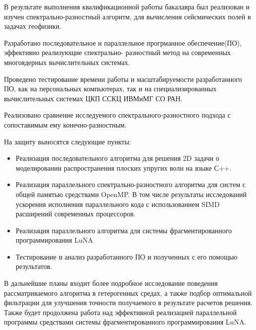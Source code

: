 
В результате выполнения квалификационной работы бакалавра был реализован и изучен спектрально-разностный алгоритм,
для вычисления сейсмических полей в задачах геофизики.

Разработано последовательное и параллельное прогрманное обеспечение(ПО), эффективно реализующие спектрально-
разностный метод на современных многоядерных вычислительных системах.

Проведено тестирование времени работы и масштабируемости разработанного ПО, как на персональных компьютерах,
так и на специализированных вычислительных системах ЦКП ССКЦ ИВМиМГ СО РАН.

Реализовано сравнение исследуемого спектрального-разностного подхода с сопоставимым ему конечно-разностным.

На защиту выносятся следующие пункты:

\begin{itemize}
    \item Реализация последовательного алгоритма для решения 2D задачи о моделировании
    распространения плоских упругих волн на языке С++.
    \item Реализация параллельного спектрально-разностного алгоритма для систем с общей памятью средствами OpenMP. В том числе
    результаты исследований ускорения исполнения параллельного кода с использованием SIMD расширений современных процессоров.
    \item Реализация параллельного алгоритма для системы фрагментированного программирования LuNA
    \item Тестирование и анализ разработанного ПО и полученных с его помощью результатов.
\end{itemize}

В дальнейшие планы входит более подробное исследование поведения рассматриваемого алгоритма в гетерогенных средах,
а также подбор оптимальной фильтрации для улучшения точности получаемого в результате расчетов решения.
Также будет продолжена работа над эффективной реализацией параллельной программы
средствами системы фрагментированного программирования LuNA.

\clearpage
